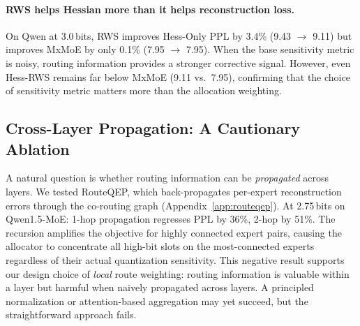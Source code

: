 \paragraph{RWS helps Hessian more than it helps reconstruction loss.}
On Qwen at 3.0\,bits, RWS improves Hess-Only PPL by 3.4\% (9.43 $\to$ 9.11) but improves MxMoE by only 0.1\% (7.95 $\to$ 7.95). When the base sensitivity metric is noisy, routing information provides a stronger corrective signal. However, even Hess-RWS remains far below MxMoE (9.11 vs.\ 7.95), confirming that the choice of sensitivity metric matters more than the allocation weighting.

\subsection{Cross-Layer Propagation: A Cautionary Ablation}

A natural question is whether routing information can be \emph{propagated} across layers. We tested RouteQEP, which back-propagates per-expert reconstruction errors through the co-routing graph (Appendix~\ref{app:routeqep}). At 2.75\,bits on Qwen1.5-MoE: 1-hop propagation regresses PPL by 36\%, 2-hop by 51\%. The recursion amplifies the objective for highly connected expert pairs, causing the allocator to concentrate all high-bit slots on the most-connected experts regardless of their actual quantization sensitivity. This negative result supports our design choice of \emph{local} route weighting: routing information is valuable within a layer but harmful when naively propagated across layers. A principled normalization or attention-based aggregation may yet succeed, but the straightforward approach fails.
